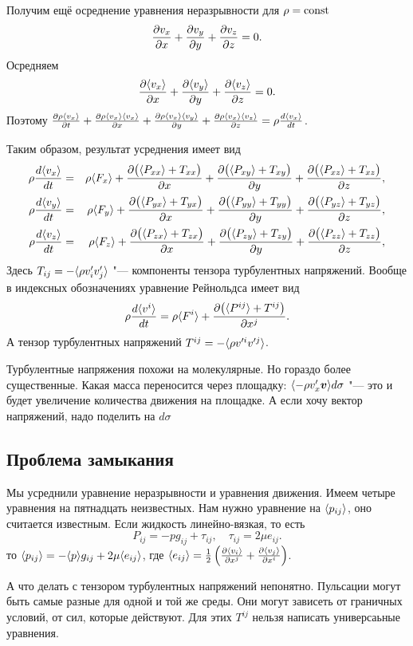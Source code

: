 Получим ещё осреднение уравнения неразрывности для $\rho=\operatorname{const}$
\[
  \frac{\partial  v_x}{\partial x} + \frac{\partial v_y}{\partial y} + \frac{\partial  v_z}{\partial z}=0. 
\]
Осредняем
\[
  \frac{\partial  \langle v_x \rangle}{\partial x} + \frac{\partial \langle v_y \rangle}{\partial y} + \frac{\partial  \langle v_z \rangle}{\partial z}=0. 
\]
Поэтому $
  \frac{\partial \rho\langle v_x \rangle}{\partial t} + \frac{\partial \rho\langle v_x \rangle\langle v_x \rangle}{\partial x} + 
  \frac{\partial \rho \langle v_x \rangle\langle v_y \rangle}{\partial y} + \frac{\partial \rho\langle v_x \rangle\langle v_z \rangle}{\partial z} =\rho\frac{d\langle v_x \rangle}{dt} $.

Таким образом, результат усреднения имеет вид
\begin{eqnarray*}
  \rho\frac{d\langle v_x \rangle}{dt} &=& \rho\langle F_x \rangle +   \frac{\partial \big(\langle P_{xx} \rangle+T_{xx}\big)}{\partial x} + \frac{\partial \big(\langle P_{xy} \rangle+T_{xy}\big)}{\partial y} + \frac{\partial \big(\langle P_{xz} \rangle+T_{xz}\big)}{\partial z},\\
  \rho\frac{d\langle v_y \rangle}{dt} &=& \rho\langle F_y \rangle +   \frac{\partial \big(\langle P_{yx} \rangle+T_{yx}\big)}{\partial x} + \frac{\partial \big(\langle P_{yy} \rangle+T_{yy}\big)}{\partial y} + \frac{\partial \big(\langle P_{yz} \rangle+T_{yz}\big)}{\partial z},\\
  \rho\frac{d\langle v_z \rangle}{dt} &=& \rho\langle F_z \rangle +   \frac{\partial \big(\langle P_{zx} \rangle+T_{zx}\big)}{\partial x} + \frac{\partial \big(\langle P_{zy} \rangle+T_{zy}\big)}{\partial y} + \frac{\partial \big(\langle P_{zz} \rangle+T_{zz}\big)}{\partial z},\\
\end{eqnarray*}
Здесь $T_{ij} = -\langle \rho v_i'v_j' \rangle$ "--- компоненты тензора турбулентных напряжений. Вообще в индексных обозначениях уравнение Рейнольдса имеет вид
\[
  \rho\frac{d\langle v^i \rangle}{dt} = \rho\langle F^i \rangle + \frac{\partial \big(\langle P^{ij} \rangle + T^{ij}\big)}{\partial x^j}.
\]
А тензор турбулентных напряжений $T^{ij} = -\langle \rho v'^iv'^j \rangle$.

Турбулентные напряжения похожи на молекулярные. Но гораздо более существенные. Какая масса переносится через площадку: $\langle -\rho v'_x \boldsymbol{v} \rangle d\sigma$ "--- это и будет увеличение количества движения на площадке. А если хочу вектор напряжений, надо поделить на $d\sigma$

\subsection{Проблема замыкания}
Мы усреднили уравнение неразрывности и уравнения движения. Имеем четыре уравнения на пятнадцать неизвестных. Нам нужно уравнение на $\langle p_{ij} \rangle$, оно считается известным. Если жидкость линейно-вязкая, то есть
\[
  P_{ij} = -p g_{ij} + \tau_{ij},\quad \tau _{ij} = 2\mu e_{ij}.
\]
то  $\langle p_{ij} \rangle = -\langle p \rangle g_{ij} + 2\mu\langle e_{ij} \rangle$, где $\langle e_{ij} \rangle = \frac12\left(\frac{\partial \langle v_i \rangle}{\partial x^j} + \frac{\partial \langle v_j \rangle}{\partial x^i}\right)$.

А что делать с тензором турбулентных напряжений непонятно. Пульсации могут быть самые разные для одной и той же среды. Они могут зависеть от граничных условий, от сил, которые действуют. Для этих $T^{ij}$ нельзя написать универсаьные уравнения.
